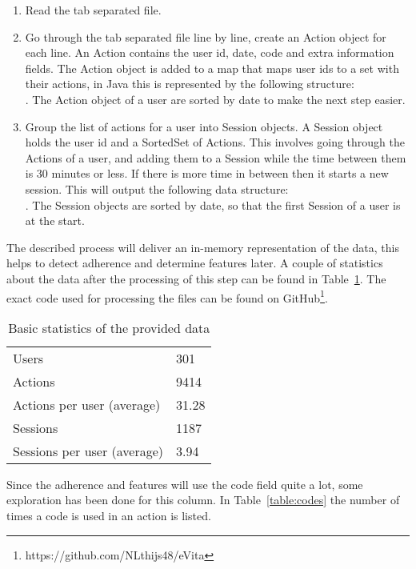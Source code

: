 \begin{enumerate}
	\item Read the tab separated file.
	\item Go through the tab separated file line by line, create an Action object for each line. An Action contains the user id, date, code and extra information fields. The Action object is added to a map that maps user ids to a set with their actions, in Java this is represented by the following structure:\\ . The Action object of a user are sorted by date to make the next step easier.
	\item Group the list of actions for a user into Session objects. A Session object holds the user id and a SortedSet of Actions. This involves going through the Actions of a user, and adding them to a Session while the time between them is 30 minutes or less. If there is more time in between then it starts a new session. This will output the following data structure:\\ . The Session objects are sorted by date, so that the first Session of a user is at the start.
\end{enumerate}

The described process will deliver an in-memory representation of the data, this helps to detect adherence and determine features later. A couple of statistics about the data after the processing of this step can be found in Table~\ref{table:dataStats}. The exact code used for processing the files can be found on GitHub\footnote{https://github.com/NLthijs48/eVita}.

\begin{table}[]
	\centering
	\caption{Basic statistics of the provided data}
	\label{table:dataStats}
	\begin{tabular}{@{}ll@{}}
		\toprule
		Users                       & 301   \\
		Actions                     & 9414  \\
		Actions per user (average)  & 31.28 \\
		Sessions                    & 1187  \\
		Sessions per user (average) & 3.94  \\ \bottomrule
	\end{tabular}
\end{table}

Since the adherence and features will use the code field quite a lot, some exploration has been done for this column. In Table~\ref{table:codes} the number of times a code is used in an action is listed.

